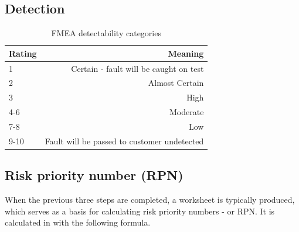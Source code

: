 \subsection{Detection}
\label{sec:fmea_detection}

\begin{table}[h]
\centering
    \begin{tabular}{ | l | r | }
    \hline
    Rating & Meaning \\ \hline \hline
    1      & Certain - fault will be caught on test  \\ \hline
    2      & Almost Certain \\ \hline
    3      & High \\ \hline
    4-6    & Moderate \\ \hline
    7-8    & Low \\ \hline
    9-10   & Fault will be passed to customer undetected \\ \hline
    \end{tabular}
\caption{FMEA detectability categories}
\label{table:fmea_detectability}
\end{table}




\subsection{Risk priority number (RPN)}
When the previous three steps are completed, a worksheet is typically produced, which serves as a basis for calculating risk priority numbers - or RPN. It is calculated in with the following formula.

